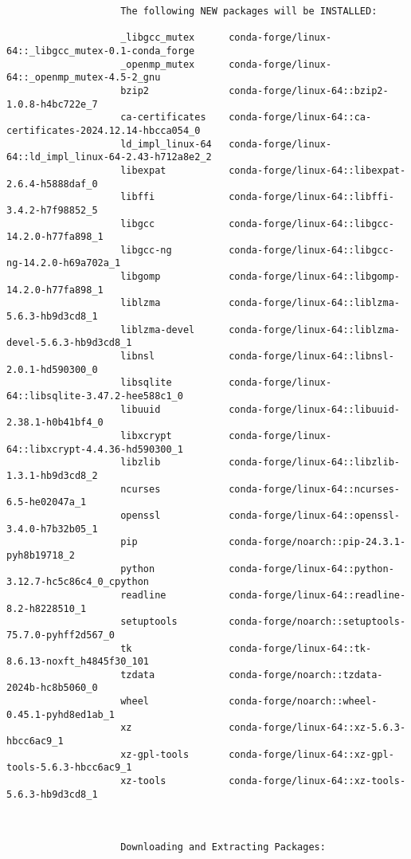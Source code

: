 \documentclass{article}
\begin{document}
\begin{enumerate}
\begin{itemize}
\begin{itemize}
\begin{itemize}
\begin{verbatim}
					The following NEW packages will be INSTALLED:
					
					_libgcc_mutex      conda-forge/linux-64::_libgcc_mutex-0.1-conda_forge 
					_openmp_mutex      conda-forge/linux-64::_openmp_mutex-4.5-2_gnu 
					bzip2              conda-forge/linux-64::bzip2-1.0.8-h4bc722e_7 
					ca-certificates    conda-forge/linux-64::ca-certificates-2024.12.14-hbcca054_0 
					ld_impl_linux-64   conda-forge/linux-64::ld_impl_linux-64-2.43-h712a8e2_2 
					libexpat           conda-forge/linux-64::libexpat-2.6.4-h5888daf_0 
					libffi             conda-forge/linux-64::libffi-3.4.2-h7f98852_5 
					libgcc             conda-forge/linux-64::libgcc-14.2.0-h77fa898_1 
					libgcc-ng          conda-forge/linux-64::libgcc-ng-14.2.0-h69a702a_1 
					libgomp            conda-forge/linux-64::libgomp-14.2.0-h77fa898_1 
					liblzma            conda-forge/linux-64::liblzma-5.6.3-hb9d3cd8_1 
					liblzma-devel      conda-forge/linux-64::liblzma-devel-5.6.3-hb9d3cd8_1 
					libnsl             conda-forge/linux-64::libnsl-2.0.1-hd590300_0 
					libsqlite          conda-forge/linux-64::libsqlite-3.47.2-hee588c1_0 
					libuuid            conda-forge/linux-64::libuuid-2.38.1-h0b41bf4_0 
					libxcrypt          conda-forge/linux-64::libxcrypt-4.4.36-hd590300_1 
					libzlib            conda-forge/linux-64::libzlib-1.3.1-hb9d3cd8_2 
					ncurses            conda-forge/linux-64::ncurses-6.5-he02047a_1 
					openssl            conda-forge/linux-64::openssl-3.4.0-h7b32b05_1 
					pip                conda-forge/noarch::pip-24.3.1-pyh8b19718_2 
					python             conda-forge/linux-64::python-3.12.7-hc5c86c4_0_cpython 
					readline           conda-forge/linux-64::readline-8.2-h8228510_1 
					setuptools         conda-forge/noarch::setuptools-75.7.0-pyhff2d567_0 
					tk                 conda-forge/linux-64::tk-8.6.13-noxft_h4845f30_101 
					tzdata             conda-forge/noarch::tzdata-2024b-hc8b5060_0 
					wheel              conda-forge/noarch::wheel-0.45.1-pyhd8ed1ab_1 
					xz                 conda-forge/linux-64::xz-5.6.3-hbcc6ac9_1 
					xz-gpl-tools       conda-forge/linux-64::xz-gpl-tools-5.6.3-hbcc6ac9_1 
					xz-tools           conda-forge/linux-64::xz-tools-5.6.3-hb9d3cd8_1 
					
					
					
					Downloading and Extracting Packages:
					

\end{verbatim}
\end{itemize}
\end{itemize}
\end{itemize}
\end{enumerate}
\end{document}
